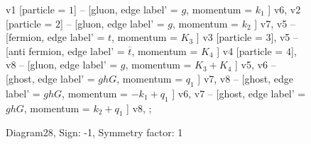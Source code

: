 \documentclass{revtex4}
\begin{document}
\begin{figure}[!htb]
\begin{center}
{    %
v1 [particle = \(1\)] -- [gluon, edge label' = \(g\), momentum = \(k_{1}\) ] v6, 
v2 [particle = \(2\)] -- [gluon, edge label' = \(g\), momentum = \(k_{2}\) ] v7, 
v5 -- [fermion, edge label' = \(t\), momentum = \(K_{3}\) ] v3 [particle = \(3\)], 
v5 -- [anti fermion, edge label' = \(\overline{t}\), momentum = \(K_{4}\) ] v4 [particle = \(4\)], 
v8 -- [gluon, edge label' = \(g\), momentum = \(K_{3} + K_{4}\) ] v5, 
v6 -- [ghost, edge label' = \(ghG\), momentum = \(q_{1}\) ] v7, 
v8 -- [ghost, edge label' = \(ghG\), momentum = \(-k_{1} + q_{1}\) ] v6, 
v7 -- [ghost, edge label' = \(ghG\), momentum = \(k_{2} + q_{1}\) ] v8, 
};
\end{center}
\caption{Diagram28, Sign: -1, Symmetry factor: 1}
\end{figure}
\newpage
\end{document}
